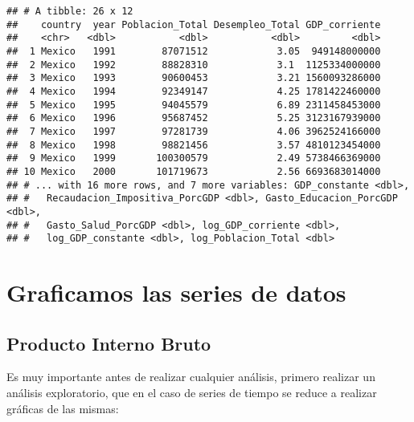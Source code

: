 \documentclass[]{book}
\theoremstyle{definition}
\theoremstyle{definition}
\theoremstyle{definition}
\theoremstyle{remark}
\begin{document}
\begin{verbatim}
## # A tibble: 26 x 12
##    country  year Poblacion_Total Desempleo_Total GDP_corriente
##    <chr>   <dbl>           <dbl>           <dbl>         <dbl>
##  1 Mexico   1991        87071512            3.05  949148000000
##  2 Mexico   1992        88828310            3.1  1125334000000
##  3 Mexico   1993        90600453            3.21 1560093286000
##  4 Mexico   1994        92349147            4.25 1781422460000
##  5 Mexico   1995        94045579            6.89 2311458453000
##  6 Mexico   1996        95687452            5.25 3123167939000
##  7 Mexico   1997        97281739            4.06 3962524166000
##  8 Mexico   1998        98821456            3.57 4810123454000
##  9 Mexico   1999       100300579            2.49 5738466369000
## 10 Mexico   2000       101719673            2.56 6693683014000
## # ... with 16 more rows, and 7 more variables: GDP_constante <dbl>,
## #   Recaudacion_Impositiva_PorcGDP <dbl>, Gasto_Educacion_PorcGDP <dbl>,
## #   Gasto_Salud_PorcGDP <dbl>, log_GDP_corriente <dbl>,
## #   log_GDP_constante <dbl>, log_Poblacion_Total <dbl>
\end{verbatim}

\section{Graficamos las series de
datos}\label{graficamos-las-series-de-datos}

\subsection{Producto Interno Bruto}\label{producto-interno-bruto}

Es muy importante antes de realizar cualquier análisis, primero realizar
un análisis exploratorio, que en el caso de series de tiempo se reduce a
realizar gráficas de las mismas:
\end{document}
